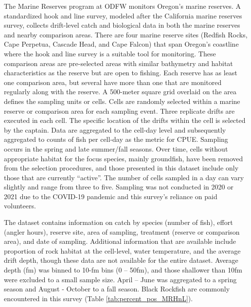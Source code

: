 \documentclass[11pt,
  english,
  letterpaper,
]{article}
\begin{document}
The Marine Reserves program at ODFW monitors Oregon's marine reserves. A standardized hook and line survey, modeled after the California marine reserves survey, collects drift-level catch and biological data in both the marine reserves and nearby comparison areas. There are four marine reserve sites (Redfish Rocks, Cape Perpetua, Cascade Head, and Cape Falcon) that span Oregon's coastline where the hook and line survey is a suitable tool for monitoring. These comparison areas are pre-selected areas with similar bathymetry and habitat characteristics as the reserve but are open to fishing. Each reserve has as least one comparison area, but several have more than one that are monitored regularly along with the reserve. A 500-meter square grid overlaid on the area defines the sampling units or cells. Cells are randomly selected within a marine reserve or comparison area for each sampling event. Three replicate drifts are executed in each cell. The specific location of the drifts within the cell is selected by the captain. Data are aggregated to the cell-day level and subsequently aggregated to counts of fish per cell-day as the metric for CPUE. Sampling occurs in the spring and late summer/fall seasons. Over time, cells without appropriate habitat for the focus species, mainly groundfish, have been removed from the selection procedures, and those presented in this dataset include only those that are currently ``active''. The number of cells sampled in a day can vary slightly and range from three to five. Sampling was not conducted in 2020 or 2021 due to the COVID-19 pandemic and this survey's reliance on paid volunteers.

The dataset contains information on catch by species (number of fish), effort (angler hours), reserve site, area of sampling, treatment (reserve or comparison area), and date of sampling. Additional information that are available include proportion of rock habitat at the cell-level, water temperature, and the average drift depth, though these data are not available for the entire dataset. Average depth (fm) was binned to 10-fm bins (0 -- 50fm), and those shallower than 10fm were excluded to a small sample size. April -- June was aggregated to a spring season and August - October to a fall season. Black Rockfish are commonly encountered in this survey (Table \ref{tab:percent_pos_MRHnL}).
\end{document}

